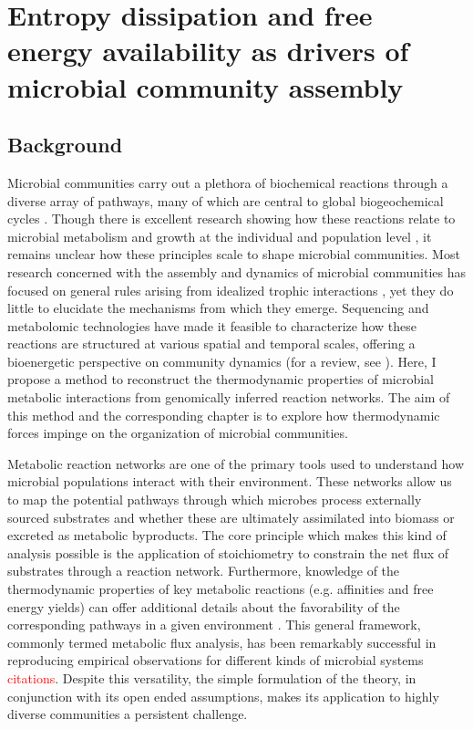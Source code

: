 \chapter{ Entropy dissipation and free energy availability as drivers of microbial community assembly}

\section{Background}

Microbial communities carry out a plethora of biochemical reactions through a diverse array of pathways, many of which are central to global biogeochemical cycles \cite{falkowski_microbial_2008}. Though there is excellent research showing how these reactions relate to microbial metabolism and growth at the individual and population level \cite{tang2017a}, it remains unclear how these principles scale to shape microbial communities. Most research concerned with the assembly and dynamics of microbial communities has focused on general rules arising from idealized trophic interactions \cite{bosi_perspectives_2017, van_den_berg_ecological_2022}, yet they do little to elucidate the mechanisms from which they emerge. Sequencing and metabolomic technologies have made it feasible to characterize how these reactions are structured at various spatial and temporal scales, offering a bioenergetic perspective on community dynamics (for a review, see \cite{kreft_genes_2017}). Here, I propose a method to reconstruct the thermodynamic properties of microbial metabolic interactions from genomically inferred reaction networks. The aim of this method and the corresponding chapter is to explore how thermodynamic forces impinge on the organization of microbial communities. 


Metabolic reaction networks are one of the primary tools used to understand how microbial populations interact with their environment. These networks allow us to map the potential pathways through which microbes process externally sourced substrates and whether these are ultimately assimilated into biomass or excreted as metabolic byproducts. The core principle which makes this kind of analysis possible is the application of stoichiometry to constrain the net flux of substrates through a reaction network. Furthermore, knowledge of the thermodynamic properties of key metabolic reactions (e.g. affinities and free energy yields) can offer additional details about the favorability of the corresponding pathways in a given environment \cite{kleerebezem2010a}. This general framework, commonly termed metabolic flux analysis, has been remarkably successful in reproducing empirical observations for different kinds of microbial systems \textcolor{red}{citations}. Despite this versatility, the simple formulation of the theory, in conjunction with its open ended assumptions, makes its application to highly diverse communities a persistent challenge. 

